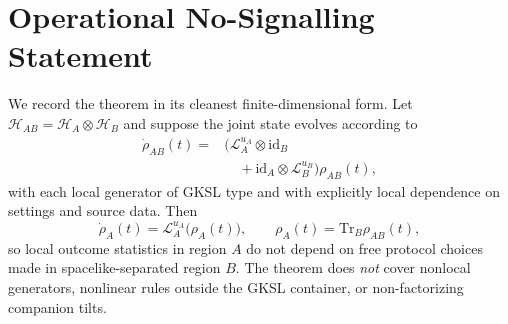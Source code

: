 \documentclass[aps,prd,twocolumn,superscriptaddress,nofootinbib]{revtex4-2}
\begin{document}
\section{Operational No-Signalling Statement}
We record the theorem in its cleanest finite-dimensional form. Let $\mathcal{H}_{AB}=\mathcal{H}_A\otimes \mathcal{H}_B$ and suppose the joint state evolves according to
\begin{equation}
\begin{split}
\dot\rho_{AB}(t)={}&\bigl(\mathcal{L}^{u_A}_A\otimes \mathrm{id}_B \\
&\quad + \mathrm{id}_A\otimes \mathcal{L}^{u_B}_B\bigr)\rho_{AB}(t),
\end{split}
\end{equation}
with each local generator of GKSL type and with explicitly local dependence on settings and source data. Then
\begin{equation}
\dot\rho_A(t)=\mathcal{L}^{u_A}_A\bigl(\rho_A(t)\bigr),\qquad \rho_A(t)=\mathrm{Tr}_B\rho_{AB}(t),
\end{equation}
so local outcome statistics in region $A$ do not depend on free protocol choices made in spacelike-separated region $B$. The theorem does \emph{not} cover nonlocal generators, nonlinear rules outside the GKSL container, or non-factorizing companion tilts.
\end{document}
